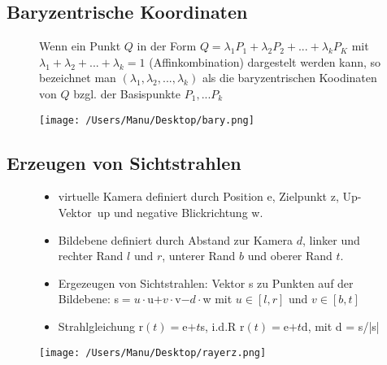 \documentclass[paper=a4, fontsize=11pt]{scrartcl} %
\numberwithin{equation}{section} %
\numberwithin{figure}{section} %
\numberwithin{table}{section} %
\begin{document}
\subsection{Baryzentrische Koordinaten}

\begin{figure}[htbp]
\begin{minipage}[t]{10cm}
\vspace{0pt}
Wenn ein Punkt $Q$ in der Form $Q = \lambda_1 P_1 + \lambda_2 P_2 + ... + \lambda_k P_K$ mit $\lambda_1 + \lambda_2 + ... + \lambda_k = 1$ (Affinkombination) dargestelt werden kann, so bezeichnet man $(\lambda_1, \lambda_2, ..., \lambda_k)$ als die baryzentrischen Koodinaten von $Q$ bzgl. der Basispunkte $P_1,...P_k$
\end{minipage}
\hfill
\begin{minipage}[t]{4cm}
\vspace{0pt}
\centering
\texttt{[image: /Users/Manu/Desktop/bary.png]}
\end{minipage}
\end{figure}

\subsection{Erzeugen von Sichtstrahlen}

\begin{figure}[htbp]
\begin{minipage}[t]{10cm}
\vspace{0pt}
\begin{itemize}
\item virtuelle Kamera definiert durch Position e, Zielpunkt z, \glqq Up-Vektor\grqq\ up und negative Blickrichtung w.
\item Bildebene definiert durch Abstand zur Kamera $d$, linker und rechter Rand $l$ und $r$, unterer Rand $b$ und oberer Rand $t$.
\item Ergezeugen von Sichtstrahlen: Vektor s zu Punkten auf der Bildebene: s$= u \cdot $u$ + v \cdot $v$ - d \cdot $w mit $u \in [l,r]$ und $v \in [b,t]$
\item Strahlgleichung r$(t) = $e$+t$s, i.d.R r$(t) = $e$ + t $d, mit d = s/|s|
\end{itemize}
\end{minipage}
\hfill
\begin{minipage}[t]{4cm}
\vspace{0pt}
\centering
\texttt{[image: /Users/Manu/Desktop/rayerz.png]}
\end{minipage}
\end{figure}
\end{document}
